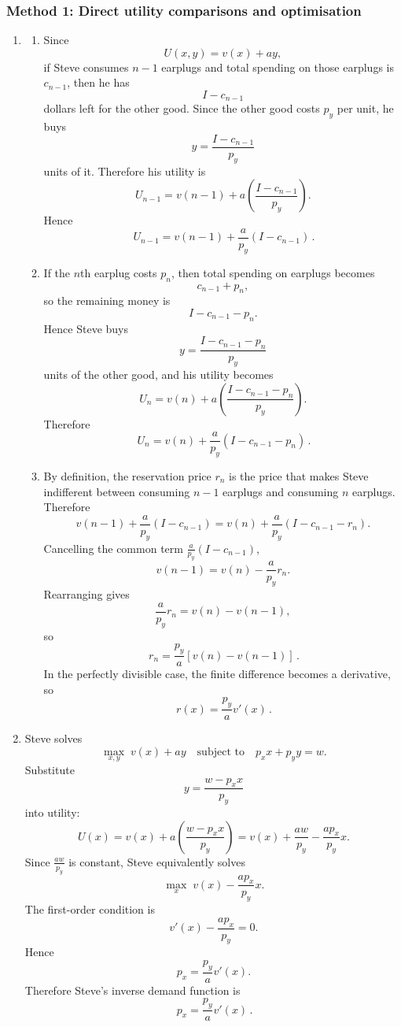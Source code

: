 \documentclass[12pt]{article}
\begin{document}
\subsubsection{Method 1: Direct utility comparisons and optimisation}
\begin{enumerate}[label=(\alph*)]
    \item
    \begin{enumerate}[label=(\roman*)]
        \item
        Since
        \[
        U(x,y)=v(x)+ay,
        \]
        if Steve consumes \(n-1\) earplugs and total spending on those earplugs is \(c_{n-1}\), then he has
        \[
        I-c_{n-1}
        \]
        dollars left for the other good. Since the other good costs \(p_y\) per unit, he buys
        \[
        y=\frac{I-c_{n-1}}{p_y}
        \]
        units of it. Therefore his utility is
        \[
        U_{n-1}=v(n-1)+a\left(\frac{I-c_{n-1}}{p_y}\right).
        \]
        Hence
        \[
        \boxed{\,U_{n-1}=v(n-1)+\frac{a}{p_y}(I-c_{n-1})\,.}
        \]

        \item
        If the \(n\)th earplug costs \(p_n\), then total spending on earplugs becomes
        \[
        c_{n-1}+p_n,
        \]
        so the remaining money is
        \[
        I-c_{n-1}-p_n.
        \]
        Hence Steve buys
        \[
        y=\frac{I-c_{n-1}-p_n}{p_y}
        \]
        units of the other good, and his utility becomes
        \[
        U_n=v(n)+a\left(\frac{I-c_{n-1}-p_n}{p_y}\right).
        \]
        Therefore
        \[
        \boxed{\,U_n=v(n)+\frac{a}{p_y}(I-c_{n-1}-p_n)\,.}
        \]
\newpage
        \item
        By definition, the reservation price \(r_n\) is the price that makes Steve indifferent between consuming \(n-1\) earplugs and consuming \(n\) earplugs. Therefore
        \[
        v(n-1)+\frac{a}{p_y}(I-c_{n-1})
        =
        v(n)+\frac{a}{p_y}(I-c_{n-1}-r_n).
        \]
        Cancelling the common term \(\frac{a}{p_y}(I-c_{n-1})\),
        \[
        v(n-1)=v(n)-\frac{a}{p_y}r_n.
        \]
        Rearranging gives
        \[
        \frac{a}{p_y}r_n=v(n)-v(n-1),
        \]
        so
        \[
        \boxed{\,r_n=\frac{p_y}{a}[v(n)-v(n-1)]\,.}
        \]
        In the perfectly divisible case, the finite difference becomes a derivative, so
        \[
        \boxed{\,r(x)=\frac{p_y}{a}v'(x)\,.}
        \]
    \end{enumerate}

    \item
    Steve solves
    \[
    \max_{x,y}\; v(x)+ay
    \quad\text{subject to}\quad
    p_xx+p_yy=w.
    \]
    Substitute
    \[
    y=\frac{w-p_xx}{p_y}
    \]
    into utility:
    \[
    U(x)=v(x)+a\left(\frac{w-p_xx}{p_y}\right)
    =v(x)+\frac{aw}{p_y}-\frac{ap_x}{p_y}x.
    \]
    Since \(\frac{aw}{p_y}\) is constant, Steve equivalently solves
    \[
    \max_x\; v(x)-\frac{ap_x}{p_y}x.
    \]
    The first-order condition is
    \[
    v'(x)-\frac{ap_x}{p_y}=0.
    \]
    Hence
    \[
    p_x=\frac{p_y}{a}v'(x).
    \]
    Therefore Steve’s inverse demand function is
    \[
    \boxed{\,p_x=\frac{p_y}{a}v'(x)\,.}
    \]


\end{enumerate}
\end{document}
